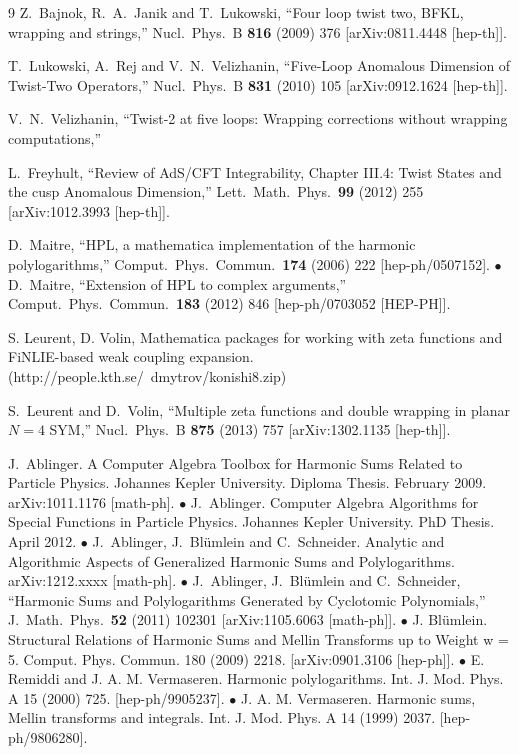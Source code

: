 \documentclass[a4paper,11pt]{article}
\numberwithin{equation}{section}
\begin{document}
\begin{thebibliography} {9}
  Z.~Bajnok, R.~A.~Janik and T.~Lukowski,
  ``Four loop twist two, BFKL, wrapping and strings,''
  Nucl.\ Phys.\ B {\bf 816} (2009) 376
  [arXiv:0811.4448 [hep-th]].

  T.~Lukowski, A.~Rej and V.~N.~Velizhanin,
  ``Five-Loop Anomalous Dimension of Twist-Two Operators,''
  Nucl.\ Phys.\ B {\bf 831} (2010) 105
  [arXiv:0912.1624 [hep-th]].

  V.~N.~Velizhanin,
  ``Twist-2 at five loops: Wrapping corrections without wrapping computations,''

  L.~Freyhult,
  ``Review of AdS/CFT Integrability, Chapter III.4: Twist States and the cusp Anomalous Dimension,''
  Lett.\ Math.\ Phys.\  {\bf 99} (2012) 255
  [arXiv:1012.3993 [hep-th]].

D.~Maitre,
  ``HPL, a mathematica implementation of the harmonic polylogarithms,''
  Comput.\ Phys.\ Commun.\  {\bf 174} (2006) 222
  [hep-ph/0507152]. $\bullet$
  D.~Maitre,
  ``Extension of HPL to complex arguments,''
  Comput.\ Phys.\ Commun.\  {\bf 183} (2012) 846
  [hep-ph/0703052 [HEP-PH]].

S. Leurent, D. Volin, Mathematica packages for working with zeta
functions and FiNLIE-based weak coupling expansion.
(http://people.kth.se/~dmytrov/konishi8.zip)

  S.~Leurent and D.~Volin,
  ``Multiple zeta functions and double wrapping in planar $N=4$ SYM,''
  Nucl.\ Phys.\ B {\bf 875} (2013) 757
  [arXiv:1302.1135 [hep-th]].

  J.~Ablinger.
  A Computer Algebra Toolbox for Harmonic Sums Related to Particle Physics. Johannes Kepler University. Diploma Thesis. February 2009.
  arXiv:1011.1176 [math-ph].   $\bullet$
J.~Ablinger. Computer Algebra Algorithms for Special Functions in Particle Physics. Johannes Kepler University. PhD Thesis. April 2012. $\bullet$
J.~Ablinger, J.~Bl\"umlein and C.~Schneider. Analytic and Algorithmic Aspects of Generalized Harmonic Sums and Polylogarithms. arXiv:1212.xxxx [math-ph].
$\bullet$
  J.~Ablinger, J.~Bl\"umlein and C.~Schneider,
  ``Harmonic Sums and Polylogarithms Generated by Cyclotomic Polynomials,''
  J.\ Math.\ Phys.\  {\bf 52} (2011) 102301
[arXiv:1105.6063 [math-ph]].
$\bullet$
J. Bl\"umlein. Structural Relations of Harmonic Sums and Mellin Transforms up to Weight w = 5. Comput. Phys. Commun. 180 (2009) 2218. [arXiv:0901.3106 [hep-ph]].
$\bullet$
E. Remiddi and J. A. M. Vermaseren. Harmonic polylogarithms. Int. J. Mod. Phys. A 15 (2000) 725. [hep-ph/9905237].
$\bullet$
J. A. M. Vermaseren. Harmonic sums, Mellin transforms and integrals. Int. J. Mod. Phys. A 14 (1999) 2037. [hep-ph/9806280].


\end{thebibliography}
\end{document}
